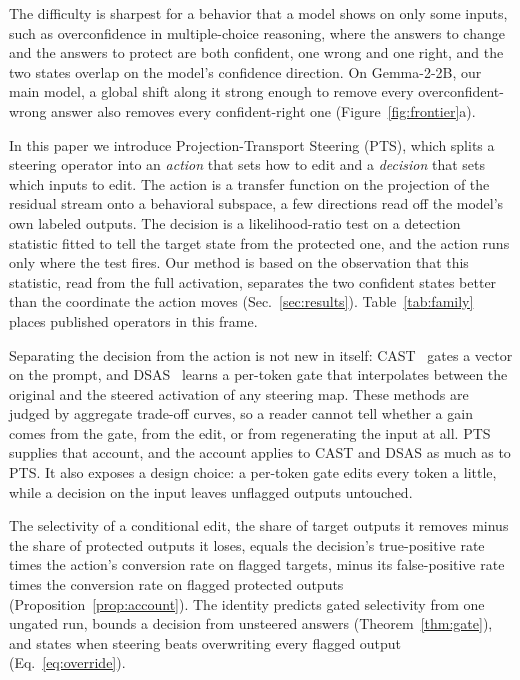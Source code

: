 The difficulty is sharpest for a behavior that a model shows on only some
inputs, such as overconfidence in multiple-choice reasoning, where the answers
to change and the answers to protect are both confident, one wrong and one
right, and the two states overlap on the model's confidence direction. On
Gemma-2-2B, our main model, a global shift along it strong enough to remove
every overconfident-wrong answer also removes every confident-right one
(Figure~\ref{fig:frontier}a).

In this paper we introduce Projection-Transport Steering (PTS), which splits a
steering operator into an \emph{action} that sets how to edit and a
\emph{decision} that sets which inputs to edit. The action is a transfer
function on the projection of the residual stream onto a behavioral subspace,
a few directions read off the model's own labeled outputs. The decision is a
likelihood-ratio test on a detection statistic fitted to tell the target state
from the protected one, and the action runs only where the test fires. Our
method is based on the observation that this statistic, read from the full
activation, separates the two confident states better than the coordinate the
action moves (Sec.~\ref{sec:results}). Table~\ref{tab:family} places
published operators in this frame.

Separating the decision from the action is not new in itself:
CAST~\citep{lee2024cast} gates a vector on the prompt, and
DSAS~\citep{ferrando2026dsas} learns a per-token gate that interpolates between
the original and the steered activation of any steering map. These methods are
judged by aggregate trade-off curves, so a reader cannot tell whether a gain
comes from the gate, from the edit, or from regenerating the input at all. PTS
supplies that account, and the account applies to CAST and DSAS as much as to
PTS. It also exposes a design choice: a per-token gate edits every token a
little, while a decision on the input leaves unflagged outputs untouched.

The selectivity of a conditional edit, the share of target outputs it
removes minus the share of protected outputs it loses, equals the decision's
true-positive rate times the action's conversion rate on flagged targets,
minus its false-positive rate times the conversion rate on flagged protected
outputs (Proposition~\ref{prop:account}). The identity predicts gated
selectivity from one ungated run, bounds a decision from unsteered answers
(Theorem~\ref{thm:gate}), and states when steering beats overwriting every
flagged output (Eq.~\eqref{eq:override}).

